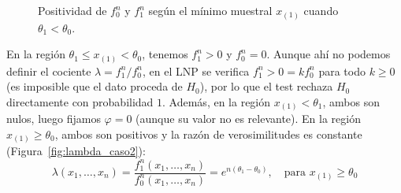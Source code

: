 \begin{ejercicio}
\begin{description}
\begin{figure}[ht]
        \caption{Positividad de $f_0^n$ y $f_1^n$ según el mínimo muestral $x_{(1)}$ cuando $\theta_1 < \theta_0$.}
        \label{fig:soporte_caso2}
    \end{figure}

    En la región $\theta_1 \le x_{(1)} < \theta_0$, tenemos $f_1^n > 0$ y $f_0^n = 0$. Aunque ahí no podemos definir el cociente $\lambda = f_1^n / f_0^n$, en el LNP se verifica $f_1^n > 0 = k f_0^n$ para todo $k \ge 0$ (es imposible que el dato proceda de $H_0$), por lo que el test rechaza $H_0$ directamente con probabilidad $1$. Además, en la región $x_{(1)} < \theta_1$, ambos son nulos, luego fijamos $\varphi = 0$ (aunque su valor no es relevante). En la región $x_{(1)} \ge \theta_0$, ambos son positivos y la razón de verosimilitudes es constante (Figura~\ref{fig:lambda_caso2}):
    \begin{equation*}
        \lambda(x_1, \dots, x_n) = \frac{f_1^n(x_1, \dots, x_n)}{f_0^n(x_1, \dots, x_n)} = e^{n(\theta_1 - \theta_0)}, \quad \text{para } x_{(1)} \ge \theta_0
    \end{equation*}

    \begin{figure}[ht]
        \centering
\end{figure}
\end{description}
\end{ejercicio}
